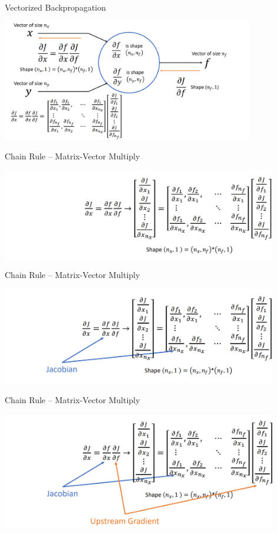 \documentclass[serif, aspectratio=169]{beamer}
\begin{document}
\begin{frame}{Vectorized Backpropagation}
    \begin{center}
        \includegraphics[width=11cm]{pic/chain10.png}  
    \end{center}
\end{frame}

\begin{frame}{Chain Rule – Matrix-Vector Multiply}
    \begin{center}
        \includegraphics[width=12cm]{pic/chain1.png}  
    \end{center}
\end{frame}

\begin{frame}{Chain Rule – Matrix-Vector Multiply}
    \begin{center}
        \includegraphics[width=12cm]{pic/chain2.png}  
    \end{center}
\end{frame}

\begin{frame}{Chain Rule – Matrix-Vector Multiply}
    \begin{center}
        \includegraphics[width=12cm]{pic/chain3.png}  
    \end{center}
\end{frame}
\end{document}
